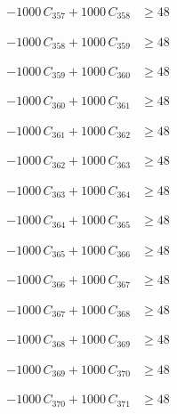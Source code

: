 \documentclass[a4paper,11pt]{article}
\begin{document}
\begin{align}
-1000\,C_{357} + 1000\,C_{358} &\geq 48 \nonumber
\end{align}

\begin{align}
-1000\,C_{358} + 1000\,C_{359} &\geq 48 \nonumber
\end{align}

\begin{align}
-1000\,C_{359} + 1000\,C_{360} &\geq 48 \nonumber
\end{align}

\begin{align}
-1000\,C_{360} + 1000\,C_{361} &\geq 48 \nonumber
\end{align}

\begin{align}
-1000\,C_{361} + 1000\,C_{362} &\geq 48 \nonumber
\end{align}

\begin{align}
-1000\,C_{362} + 1000\,C_{363} &\geq 48 \nonumber
\end{align}

\begin{align}
-1000\,C_{363} + 1000\,C_{364} &\geq 48 \nonumber
\end{align}

\begin{align}
-1000\,C_{364} + 1000\,C_{365} &\geq 48 \nonumber
\end{align}

\begin{align}
-1000\,C_{365} + 1000\,C_{366} &\geq 48 \nonumber
\end{align}

\begin{align}
-1000\,C_{366} + 1000\,C_{367} &\geq 48 \nonumber
\end{align}

\begin{align}
-1000\,C_{367} + 1000\,C_{368} &\geq 48 \nonumber
\end{align}

\begin{align}
-1000\,C_{368} + 1000\,C_{369} &\geq 48 \nonumber
\end{align}

\begin{align}
-1000\,C_{369} + 1000\,C_{370} &\geq 48 \nonumber
\end{align}

\begin{align}
-1000\,C_{370} + 1000\,C_{371} &\geq 48 \nonumber
\end{align}
\end{document}
